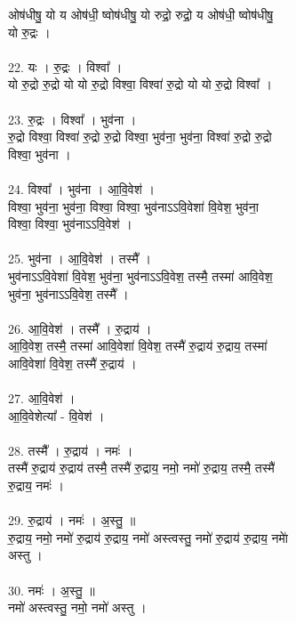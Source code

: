 ओष॑धीषु॒ यो य ओष॑धी॒ ष्वोष॑धीषु॒ यो रुद्रो॒ रुद्रो॒ य ओष॑धी॒ ष्वोष॑धीषु॒\\
यो रु॒द्रः ।\\
\\
22. यः । रु॒द्रः । विश्वा᳚ ।\\
यो रु॒द्रो रु॒द्रो यो यो रु॒द्रो विश्वा॒ विश्वा॑ रु॒द्रो यो यो रु॒द्रो विश्वा᳚ ।\\
\\
23. रु॒द्रः । विश्वा᳚ । भुव॑ना ।\\
रु॒द्रो विश्वा॒ विश्वा॑ रु॒द्रो रु॒द्रो विश्वा॒ भुव॑ना॒ भुव॑ना॒ विश्वा॑ रु॒द्रो रु॒द्रो\\
विश्वा॒ भुव॑ना ।\\
\\
24. विश्वा᳚ । भुव॑ना । आ॒वि॒वेश॑ ।\\
विश्वा॒ भुव॑ना॒ भुव॑ना॒ विश्वा॒ विश्वा॒ भुव॑नाऽऽवि॒वेशा॑ वि॒वेश॒ भुव॑ना॒\\
विश्वा॒ विश्वा॒ भुव॑नाऽऽवि॒वेश॑ ।\\
\\
25. भुव॑ना । आ॒वि॒वेश॑ । तस्मै᳚ ।\\
भुव॑नाऽऽवि॒वेशा॑ वि॒वेश॒ भुव॑ना॒ भुव॑नाऽऽवि॒वेश॒ तस्मै॒ तस्मा॑ आवि॒वेश॒\\
भुव॑ना॒ भुव॑नाऽऽवि॒वेश॒ तस्मै᳚ ।\\
\\
26. आ॒वि॒वेश॑ । तस्मै᳚ । रु॒द्राय॑ ।\\
आ॒वि॒वेश॒ तस्मै॒ तस्मा॑ आवि॒वेशा॑ वि॒वेश॒ तस्मै॑ रु॒द्राय॑ रु॒द्राय॒ तस्मा॑\\
आवि॒वेशा॑ वि॒वेश॒ तस्मै॑ रु॒द्राय॑ ।\\
\\
27. आ॒वि॒वेश॑ ।\\
आ॒वि॒वेशेत्या᳚ - वि॒वेश॑ ।\\
\\
28. तस्मै᳚ । रु॒द्राय॑ । नमः॑ ।\\
तस्मै॑ रु॒द्राय॑ रु॒द्राय॑ तस्मै॒ तस्मै॑ रु॒द्राय॒ नमो॒ नमो॑ रु॒द्राय॒ तस्मै॒ तस्मै॑\\
रु॒द्राय॒ नमः॑ ।\\
\\
29. रु॒द्राय॑ । नमः॑ । अ॒स्तु॒ ॥\\
रु॒द्राय॒ नमो॒ नमो॑ रु॒द्राय॑ रु॒द्राय॒ नमो॑ अस्त्वस्तु॒ नमो॑ रु॒द्राय॑ रु॒द्राय॒ नमाे॑\\
अस्तु ।\\
\\
30. नमः॑ । अ॒स्तु॒ ॥\\
नमो॑ अस्त्वस्तु॒ नमो॒ नमो॑ अस्तु ।\\
